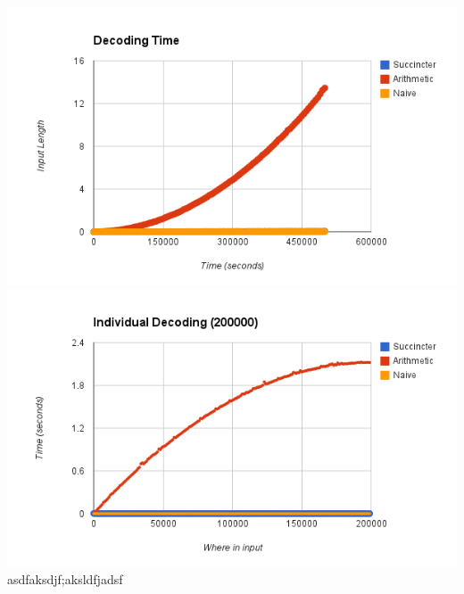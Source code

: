 \documentclass{article}
\begin{document}
\includegraphics[scale=0.4]{images/decoding_time}
\includegraphics[scale=0.4]{images/individual_decode_20000}
\afterpage{\vfill}
asdfaksdjf;aksldfjadsf\\
\end{document}
